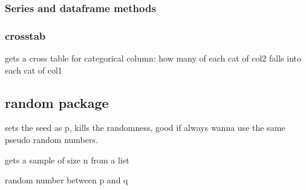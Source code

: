 		\subsubsection{Series and dataframe methods}






		\subsubsection{crosstab}
			\label{stats:panda:crosstab}

			 gets a cross table for categorical column: how many of each cat of col2 falls into each cat of col1


	\subsection{random package}


		 sets the seed as p, kills the randomness, good if always wanna use the same pseudo random numbers.

		 gets a sample of size n from a list

		 random number between p and q

